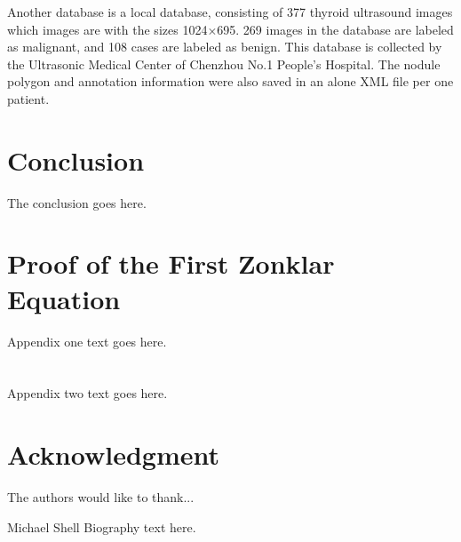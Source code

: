 \documentclass[journal]{IEEEtran}
\begin{document}
Another database is a local database, consisting of 377 thyroid ultrasound images which images are with the sizes 1024$\times$695. 269 images in the database are labeled as malignant, and 108 cases are labeled as benign. This database is collected by the Ultrasonic Medical Center of Chenzhou No.1 People's Hospital. The nodule polygon and annotation information were also saved in an alone XML file per one patient.

\section{Conclusion}
The conclusion goes here.






%


\appendices
\section{Proof of the First Zonklar Equation}
Appendix one text goes here.

\section{}
Appendix two text goes here.


\section*{Acknowledgment}


The authors would like to thank...

\cite{IEEEexample:biblatex}




\begin{IEEEbiography}{Michael Shell}
Biography text here.
\end{IEEEbiography}
\end{document}

